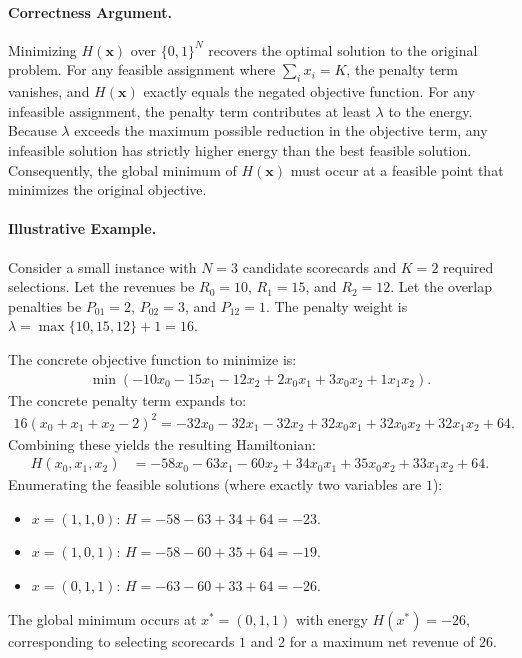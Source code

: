 \documentclass[12pt]{article}
\begin{document}
\paragraph{Correctness Argument.}
Minimizing $H(\mathbf{x})$ over $\{0,1\}^N$ recovers the optimal solution to the original problem. For any feasible assignment where $\sum_i x_i = K$, the penalty term vanishes, and $H(\mathbf{x})$ exactly equals the negated objective function. For any infeasible assignment, the penalty term contributes at least $\lambda$ to the energy. Because $\lambda$ exceeds the maximum possible reduction in the objective term, any infeasible solution has strictly higher energy than the best feasible solution. Consequently, the global minimum of $H(\mathbf{x})$ must occur at a feasible point that minimizes the original objective.

\paragraph{Illustrative Example.}
Consider a small instance with $N=3$ candidate scorecards and $K=2$ required selections. Let the revenues be $R_0 = 10$, $R_1 = 15$, and $R_2 = 12$. Let the overlap penalties be $P_{01} = 2$, $P_{02} = 3$, and $P_{12} = 1$. The penalty weight is $\lambda = \max\{10, 15, 12\} + 1 = 16$.

The concrete objective function to minimize is:
\begin{align}
    \min \left( -10x_0 - 15x_1 - 12x_2 + 2x_0x_1 + 3x_0x_2 + 1x_1x_2 \right).
\end{align}
The concrete penalty term expands to:
\begin{align}
    16(x_0 + x_1 + x_2 - 2)^2 = -32x_0 - 32x_1 - 32x_2 + 32x_0x_1 + 32x_0x_2 + 32x_1x_2 + 64.
\end{align}
Combining these yields the resulting Hamiltonian:
\begin{align}
    H(x_0, x_1, x_2) &= -58x_0 - 63x_1 - 60x_2 + 34x_0x_1 + 35x_0x_2 + 33x_1x_2 + 64.
\end{align}
Enumerating the feasible solutions (where exactly two variables are $1$):
\begin{itemize}
    \item $x = (1,1,0)$: $H = -58 - 63 + 34 + 64 = -23$.
    \item $x = (1,0,1)$: $H = -58 - 60 + 35 + 64 = -19$.
    \item $x = (0,1,1)$: $H = -63 - 60 + 33 + 64 = -26$.
\end{itemize}
The global minimum occurs at $x^* = (0,1,1)$ with energy $H(x^*) = -26$, corresponding to selecting scorecards $1$ and $2$ for a maximum net revenue of $26$.
\end{document}
